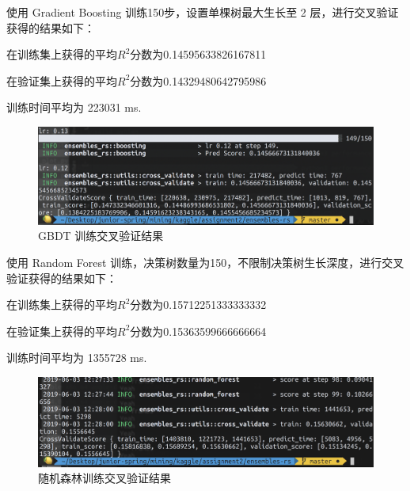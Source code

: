\documentclass[12pt]{article}
\begin{document}
使用 Gradient Boosting 训练150步，设置单棵树最大生长至 2 层，进行交叉验证获得的结果如下：

在训练集上获得的平均$R^2$分数为0.14595633826167811

在验证集上获得的平均$R^2$分数为0.14329480642795986

训练时间平均为 223031 ms.

\begin{figure}[H]
    \centering
    \includegraphics[scale=0.6]{gbdt-cv.png}
    \caption{GBDT 训练交叉验证结果}
    \label{}
\end{figure}

使用 Random Forest 训练，决策树数量为150，不限制决策树生长深度，进行交叉验证获得的结果如下：

在训练集上获得的平均$R^2$分数为0.15712251333333332

在验证集上获得的平均$R^2$分数为0.15363599666666664

训练时间平均为 1355728 ms.

\begin{figure}[H]
    \centering
    \includegraphics[scale=0.6]{rf-cv.png}
    \caption{随机森林训练交叉验证结果}
    \label{}
\end{figure}
\end{document}
